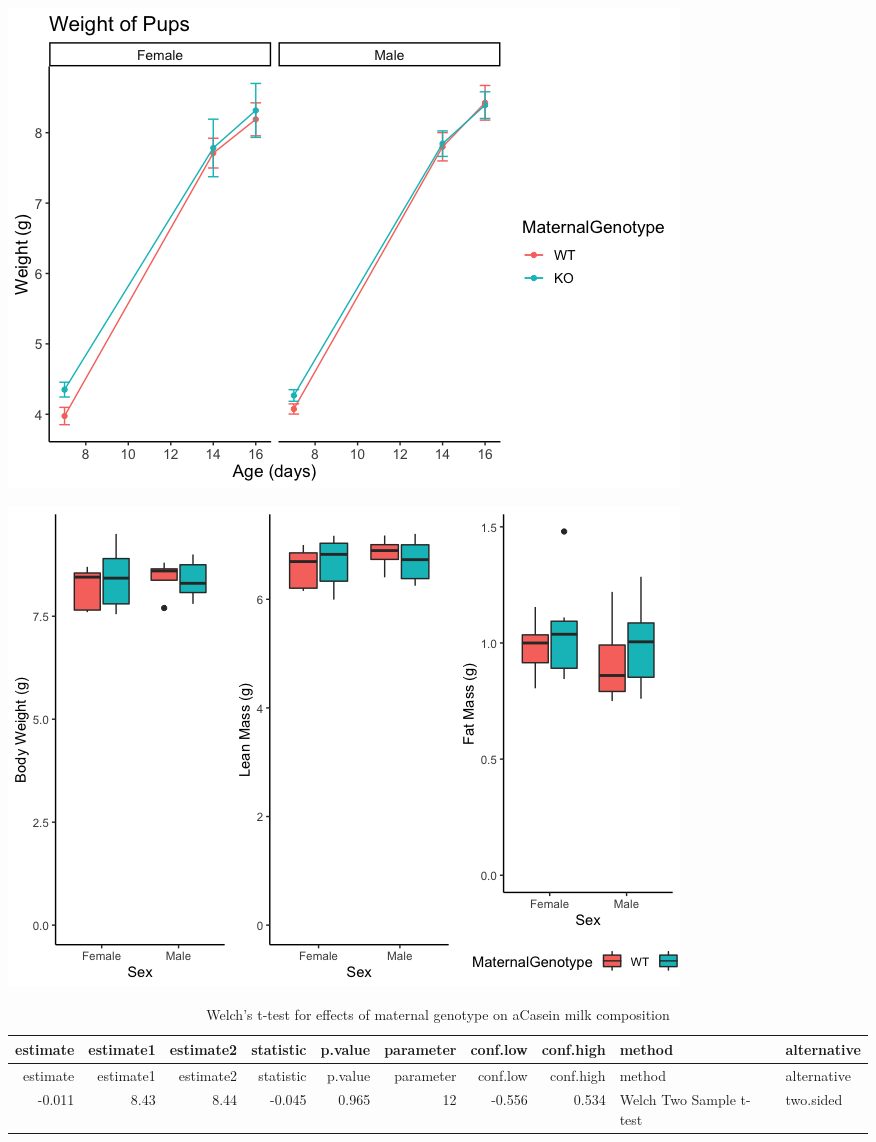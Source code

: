 \documentclass[]{article}
\begin{document}
\includegraphics{figures/combined-weights_PND7_14_16-1.png}

\includegraphics{figures/pupbodymass_PND16MRI-1.png}

\begin{longtable}[]{@{}rrrrrrrrll@{}}
\caption{Welch's t-test for effects of maternal genotype on aCasein milk
composition}\tabularnewline
\toprule
estimate & estimate1 & estimate2 & statistic & p.value & parameter &
conf.low & conf.high & method & alternative\tabularnewline
\midrule
\endfirsthead
\toprule
estimate & estimate1 & estimate2 & statistic & p.value & parameter &
conf.low & conf.high & method & alternative\tabularnewline
\midrule
\endhead
-0.011 & 8.43 & 8.44 & -0.045 & 0.965 & 12 & -0.556 & 0.534 & Welch Two
Sample t-test & two.sided\tabularnewline
\bottomrule
\end{longtable}
\end{document}
